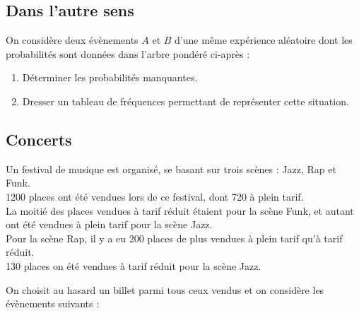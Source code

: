 \documentclass[oneside,12pt]{article}          %
\begin{document}
\subsection{Dans l'autre sens}
On considère deux évènements $A$ et $B$ d'une même expérience aléatoire dont les probabilités sont données dans l'arbre pondéré ci-après :
\begin{center}
\end{center}
\begin{enumerate}
	\item Déterminer les probabilités manquantes.
	\item Dresser un tableau de fréquences permettant de représenter cette situation.
\end{enumerate}



\subsection{Concerts}

Un festival de musique est organisé, se basant sur trois scènes : Jazz, Rap et Funk.\\
1200 places ont été vendues lors de ce festival, dont 720 à plein tarif.\\
La moitié des places vendues à tarif réduit étaient pour la scène Funk, et autant ont été vendues à plein tarif pour la scène Jazz.\\
Pour la scène Rap, il y a eu 200 places de plus vendues à plein tarif qu'à tarif réduit.\\
130 places on été vendues à tarif réduit pour la scène Jazz.

On choisit au hasard un billet parmi tous ceux vendus et on considère les évènements suivants :
\end{document}
